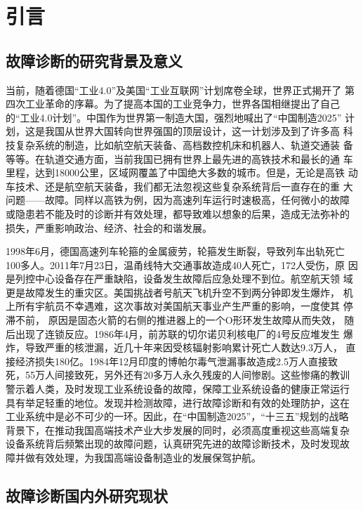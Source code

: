 \chapter{引言}
\label{cha:intro}

\section{故障诊断的研究背景及意义}

当前，随着德国“工业4.0”及美国“工业互联网”计划席卷全球，世界正式揭开了
第四次工业革命的序幕。为了提高本国的工业竞争力，世界各国相继提出了自己
的“工业4.0计划”。中国作为世界第一制造大国，强烈地喊出了“中国制造2025”
计划，这是我国从世界大国转向世界强国的顶层设计，这一计划涉及到了许多高
科技复杂系统的制造，比如航空航天装备、高档数控机床和机器人、轨道交通装
备等等。在轨道交通方面，当前我国已拥有世界上最先进的高铁技术和最长的通
车里程，达到18000公里，区域网覆盖了中国绝大多数的城市。但是，无论是高铁
动车技术、还是航空航天装备，我们都无法忽视这些复杂系统背后一直存在的重
大问题——故障。同样以高铁为例，因为高速列车运行时速极高，任何微小的故障
或隐患若不能及时的诊断并有效处理，都导致难以想象的后果，造成无法弥补的
损失，严重影响政治、经济、社会的和谐发展。

1998年6月，德国高速列车轮箍的金属疲劳，轮箍发生断裂，导致列车出轨死亡
100多人。2011年7月23日，温甬线特大交通事故造成40人死亡，172人受伤，原
因是列控中心设备存在严重缺陷，设备发生故障后应急处理不到位。航空航天领
域更是故障发生的重灾区。美国挑战者号航天飞机升空不到两分钟即发生爆炸，
机上所有宇航员不幸遇难，这次事故对美国航天事业产生严重的影响，一度使其
停滞不前， 原因是固态火箭的右侧的推进器上的一个O形环发生故障从而失效，
随后出现了连锁反应。1986年4月，前苏联的切尔诺贝利核电厂的4号反应堆发生
爆炸，导致严重的核泄漏，近几十年来因受核辐射影响累计死亡人数达9.3万人，
直接经济损失180亿。1984年12月印度的博帕尔毒气泄漏事故造成2.5万人直接致
死，55万人间接致死，另外还有20多万人永久残废的人间惨剧。这些惨痛的教训
警示着人类，及时发现工业系统设备的故障，保障工业系统设备的健康正常运行
具有举足轻重的地位。发现并检测故障，进行故障诊断和有效的处理防护，这在
工业系统中是必不可少的一环。因此，在“中国制造2025”，“十三五”规划的战略
背景下，在推动我国高端技术产业大步发展的同时，必须高度重视这些高端复杂
设备系统背后频繁出现的故障问题，认真研究先进的故障诊断技术，及时发现故
障并做有效处理，为我国高端设备制造业的发展保驾护航。

\section{故障诊断国内外研究现状}

